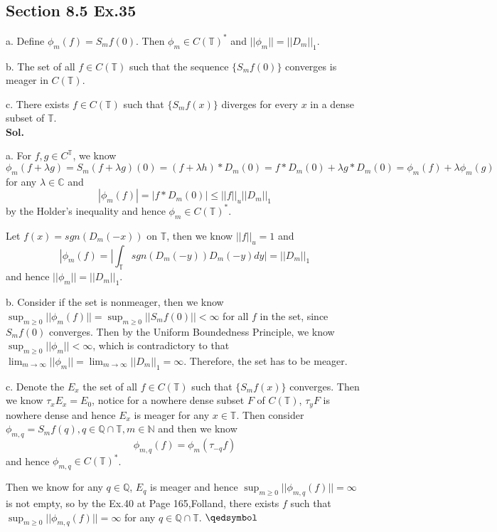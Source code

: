 \documentclass[lang=en,11pt,a4paper,citestyle =authoryear]{elegantpaper}
\newcommand{\prvd}{$\hfill \qedsymbol$}
\newcommand{\N}{\mathbb{N}}
\newcommand{\C}{\mathbb{C}}
\newcommand{\Q}{\mathbb{Q}}
\begin{document}
\subsection*{Section 8.5 Ex.35} 
a. Define $\phi_m(f) = S_mf(0)$. Then $\phi_m\in C(\mathbb{T})^*$ and $||\phi_m|| = ||D_m||_1$.\par
b. The set of all $f\in C(\mathbb{T})$ such that the sequence $\{S_mf(0)\}$ converges is meager in $C(\mathbb{T})$.\par
c. There exists $f\in C(\mathbb{T})$ such that $\{S_mf(x)\}$ diverges for every $x$ in a dense subset of $\mathbb{T}$.
\vspace{0.5em}\\
\textbf{Sol.} \par
a. For $f,g\in C^{\mathbb{T}}$, we know
\[
\phi_m(f+\lambda g) = S_m(f+\lambda g)(0) = (f+\lambda h)*D_m(0) = f*D_m(0) + \lambda g*D_m(0) = \phi_m(f)+\lambda \phi_m(g)
\]
for any $\lambda \in \C$ and
\[
|\phi_m(f)| = |f*D_m(0)| \leq ||f||_u||D_m||_1
\]
by the Holder's inequality and hence $\phi_m \in C(\mathbb{T})^*$.\par
Let $f(x) = sgn(D_m(-x))$ on $\mathbb{T}$, then we know $||f||_u = 1$ and
\[
|\phi_m(f) = |\int_{\mathbb{T}} sgn(D_m(-y))D_m(-y) dy| = ||D_m||_1
\]
and hence $||\phi_m|| = ||D_m||_1$.\par
b. Consider if the set is nonmeager, then we know $\sup_{m\geq 0}||\phi_m(f)|| = \sup_{m\geq 0}||S_mf(0)|| < \infty$ for all $f$ in the set, since $S_mf(0)$ converges. Then by the Uniform Boundedness Principle, we know $\sup_{m\geq 0}||\phi_m|| < \infty$, which is contradictory to that $\lim_{m\to\infty} ||\phi_m|| = \lim_{m\to\infty} ||D_m||_1 = \infty$. Therefore, the set has to be meager.\par
c. Denote the $E_x$ the set of all $f\in C(\mathbb{T})$ such that $\{S_mf(x)\}$ converges. Then we know $\tau_xE_x = E_0$, notice for a nowhere dense subset $F$ of $C(\mathbb{T})$, $\tau_yF$ is nowhere dense and hence $E_x$ is meager for any $x\in \mathbb{T}$. Then consider $\phi_{m,q} = S_mf(q), q\in\Q\cap\mathbb{T}, m\in \N$ and then we know
\[
\phi_{m,q}(f) = \phi_m(\tau_{-q}f)
\]
and hence $\phi_{m,q} \in C(\mathbb{T})^*$.\par
Then we know for any $q\in\Q$, $E_q$ is meager and hence $\sup_{m\geq 0}||\phi_{m,q}(f)|| =\infty$ is not empty, so by the Ex.40 at Page 165,Folland, there exists $f$ such that $\sup_{m\geq 0}||\phi_{m,q}(f)|| =\infty$ for any $q\in\Q\cap\mathbb{T}$.
\prvd
\vspace{0.5em}
\end{document}
